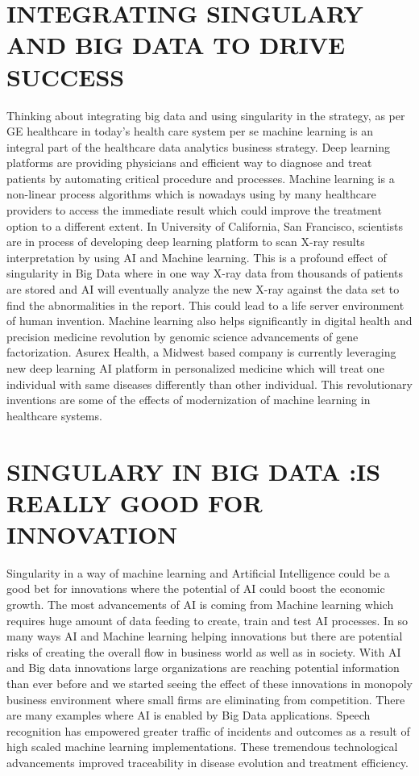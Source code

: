 \documentclass[sigconf]{acmart}
\begin{document}
\section{INTEGRATING SINGULARY AND BIG DATA TO DRIVE SUCCESS}
Thinking about integrating big data and using singularity in the strategy, as per GE healthcare in today’s health care system per se machine learning is \cite{editor02} an integral part of the healthcare data analytics business strategy. Deep learning platforms are providing physicians and efficient way to diagnose and treat patients by automating critical procedure and processes. Machine learning is a non-linear process algorithms which is nowadays using by many healthcare providers to access the immediate result which could improve the treatment option to a different extent. In University of California, San Francisco, scientists are in process of developing deep learning platform to scan X-ray results interpretation by using AI and Machine learning. This is a profound effect of singularity in Big Data where in one way X-ray data from thousands of patients are stored and AI will eventually analyze the new X-ray against the data set to find the abnormalities in the report. This could lead to a life server environment of human invention. Machine learning also helps significantly in digital health and precision medicine revolution by genomic science advancements of gene factorization. Asurex Health, a Midwest based company is currently leveraging new deep learning AI platform in personalized medicine which will treat one individual with same diseases differently than other individual. This revolutionary inventions are some of the effects of modernization of machine learning in healthcare systems.\cite{editor02}

\section{SINGULARY IN BIG DATA :IS REALLY GOOD FOR INNOVATION}
Singularity in a way of machine learning and Artificial Intelligence could be a good bet for innovations where the potential of AI could boost the economic growth. The most advancements of AI is coming from Machine learning which requires huge amount of data feeding to create, train and test AI processes. In so many ways AI and Machine learning helping innovations but there are potential risks of creating the overall flow in business world as well as in society. With AI and Big data innovations large organizations are reaching potential information than ever before and we started seeing the effect of these innovations in monopoly business environment where small firms are eliminating from competition. There are many examples where AI is enabled by Big Data applications. Speech recognition \cite{editor03} has empowered greater traffic of incidents and outcomes as a result of high scaled machine learning implementations. These tremendous technological advancements improved traceability in disease evolution and treatment efficiency.\cite{editor03}
\end{document}
